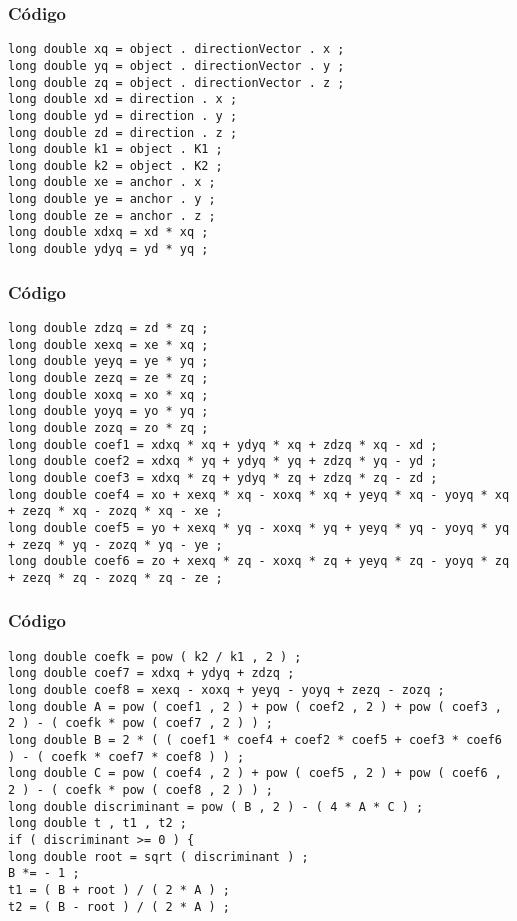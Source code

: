 \documentclass{beamer}
\begin{document}
\begin{frame}[fragile]
\frametitle{C\'odigo}
\begin{verbatim}
long double xq = object . directionVector . x ; 
long double yq = object . directionVector . y ; 
long double zq = object . directionVector . z ; 
long double xd = direction . x ; 
long double yd = direction . y ; 
long double zd = direction . z ; 
long double k1 = object . K1 ; 
long double k2 = object . K2 ; 
long double xe = anchor . x ; 
long double ye = anchor . y ; 
long double ze = anchor . z ; 
long double xdxq = xd * xq ; 
long double ydyq = yd * yq ; 
\end{verbatim}
\end{frame}
\begin{frame}[fragile]
\frametitle{C\'odigo}
\begin{verbatim}
long double zdzq = zd * zq ; 
long double xexq = xe * xq ; 
long double yeyq = ye * yq ; 
long double zezq = ze * zq ; 
long double xoxq = xo * xq ; 
long double yoyq = yo * yq ; 
long double zozq = zo * zq ; 
long double coef1 = xdxq * xq + ydyq * xq + zdzq * xq - xd ; 
long double coef2 = xdxq * yq + ydyq * yq + zdzq * yq - yd ; 
long double coef3 = xdxq * zq + ydyq * zq + zdzq * zq - zd ; 
long double coef4 = xo + xexq * xq - xoxq * xq + yeyq * xq - yoyq * xq + zezq * xq - zozq * xq - xe ; 
long double coef5 = yo + xexq * yq - xoxq * yq + yeyq * yq - yoyq * yq + zezq * yq - zozq * yq - ye ; 
long double coef6 = zo + xexq * zq - xoxq * zq + yeyq * zq - yoyq * zq + zezq * zq - zozq * zq - ze ; 
\end{verbatim}
\end{frame}
\begin{frame}[fragile]
\frametitle{C\'odigo}
\begin{verbatim}
long double coefk = pow ( k2 / k1 , 2 ) ; 
long double coef7 = xdxq + ydyq + zdzq ; 
long double coef8 = xexq - xoxq + yeyq - yoyq + zezq - zozq ; 
long double A = pow ( coef1 , 2 ) + pow ( coef2 , 2 ) + pow ( coef3 , 2 ) - ( coefk * pow ( coef7 , 2 ) ) ; 
long double B = 2 * ( ( coef1 * coef4 + coef2 * coef5 + coef3 * coef6 ) - ( coefk * coef7 * coef8 ) ) ; 
long double C = pow ( coef4 , 2 ) + pow ( coef5 , 2 ) + pow ( coef6 , 2 ) - ( coefk * pow ( coef8 , 2 ) ) ; 
long double discriminant = pow ( B , 2 ) - ( 4 * A * C ) ; 
long double t , t1 , t2 ; 
if ( discriminant >= 0 ) { 
long double root = sqrt ( discriminant ) ; 
B *= - 1 ; 
t1 = ( B + root ) / ( 2 * A ) ; 
t2 = ( B - root ) / ( 2 * A ) ; 
\end{verbatim}
\end{frame}
\end{document}
